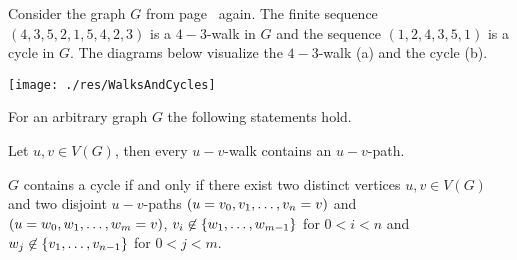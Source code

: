 \begin{exam}
Consider the graph $G$ from page~\pageref{ex:Graph} again. The finite sequence $(4, 3, 5, 2, 1, 5, 4, 2, 3)$ is a $4-3$-walk in $G$ and the sequence $(1,2,4,3,5,1)$ is a cycle in $G$. The diagrams below visualize the $4-3$-walk (a) and the cycle (b).

\begin{center}
\texttt{[image: ./res/WalksAndCycles]}
%     
%     
%     
\end{center}
\end{exam}
\begin{lem} For an arbitrary graph $G$ the following statements hold. \label{thm:Unique Paths}
\begin{thmlist}
\item Let $u,v\in V(G)$, then every $u-v$-walk contains an $u-v$-path.\label{thm:Every walk contains a trail}
\item $G$ contains a cycle if and only if there exist two distinct vertices $u,v\in V(G)$ and two disjoint $u-v$-paths $(u=v_0,\seq{v}=v)$ and $(u=w_0,\seq[m]{w}=v)$, \ie $v_i\not\in\lbrace\seq[m-1]{w}\rbrace$ for $0<i<n$ and $w_j\not\in\lbrace\seq[n-1]{v}\rbrace$ for $0<j<m$.
\end{thmlist}
\end{lem}
